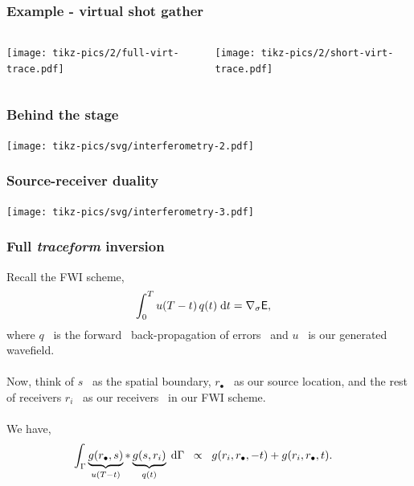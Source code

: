 \documentclass{beamer}
\begin{document}
\frame
{
\frametitle{{\bf Example - virtual shot gather}}
\begin{columns}
\begin{column}{0.5\textwidth}
\texttt{[image: tikz-pics/2/full-virt-trace.pdf]}
\end{column}
\begin{column}{0.5\textwidth}
\texttt{[image: tikz-pics/2/short-virt-trace.pdf]}
\end{column}
\end{columns}
}
\frame
{
\centering
\color{norange}{\bf theory}
}
\frame
{
\frametitle{{\bf Behind the stage}}
\texttt{[image: tikz-pics/svg/interferometry-2.pdf]}
}
\frame
{
\frametitle{{\bf Source-receiver duality}}
\texttt{[image: tikz-pics/svg/interferometry-3.pdf]}
}
\frame
{
\frametitle{{\bf Full {\it traceform} inversion}}
Recall the FWI scheme,
\begin{align*}
\int_{0}^{T} u(T-t)\, q(t) \;{\rm d}t &= \nabla_{\sigma} {\sf E},
\end{align*}
where \color{nblue}$q$~\color{black} is the forward ~\color{nblue}back-propagation of errors~\color{black} and 
\color{nblue}$u$~\color{black} is our \color{nblue}generated wavefield\color{black}.
\\~\\
Now, think of \color{nblue}$s$~\color{black} as the \color{nblue}spatial boundary\color{black}, 
\color{nblue}$r_{\bullet}$~\color{black} as our \color{nblue}source location\color{black}, 
and the rest of receivers \color{nblue}$r_i$~\color{black} as our \color{nblue}receivers~\color{black} in our FWI scheme.
\\~\\
We have,
\begin{align*}\int_{\Gamma} \underbrace{g(r_{\bullet},s)}_{u(T-t)} * \underbrace{g(s,r_i)}_{q(t)} \;{\rm d}\Gamma \;\; &\propto \;\;
g(r_i,r_{\bullet},-t) + g(r_i,r_{\bullet},t).
\end{align*}
}
\end{document}
